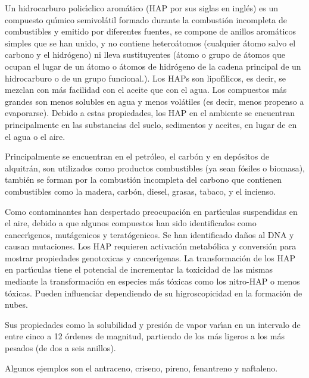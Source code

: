 Un hidrocarburo polic\'{\i}clico arom\'atico   ({HAP} por sus siglas en ingl\'es) es un compuesto qu\'{\i}mico semivol\'atil formado durante la combusti\'on incompleta de combustibles y emitido por diferentes fuentes, se compone de anillos arom\'aticos simples que se han unido, y no contiene hetero\'atomos (cualquier \'atomo salvo el carbono y el hidr\'o\-ge\-no) ni lleva sustituyentes (\'atomo o grupo de \'atomos que ocupan el lugar de un \'atomo o \'atomos de hidr\'ogeno de la cadena principal de un hidrocarburo o de un grupo funcional.). Los HAPs son lipof\'{\i}licos, es decir, se mezclan con m\'as facilidad con el aceite que con el agua. Los compuestos m\'as grandes son menos solubles en agua y menos vol\'atiles (es decir, menos propenso a evaporarse). Debido a estas propiedades, los HAP en el  ambiente se encuentran principalmente en las substancias del suelo, sedimentos y aceites, en lugar de en el agua o el aire. 

Principalmente se encuentran en el petr\'oleo, el carb\'on y en dep\'ositos de alquitr\'an, son utilizados como productos combustibles (ya sean f\'osiles o biomasa), tambi\'en se forman por la combusti\'on incompleta del carbono que contienen combustibles como la madera, carb\'on, diesel, grasas, tabaco, y el incienso.

Como contaminantes han despertado preocupaci\'on en part\'{\i}culas suspendidas en el aire, debido a que algunos compuestos han sido identificados como cancer\'{\i}genos, mut\'agenicos y terat\'ogenicos. Se han identificado da\~nos al DNA y causan mutaciones. Los HAP requieren activaci\'on metab\'olica y conversi\'on para mostrar propiedades \gls{genotoxicas} y cancer\'{\i}genas. La transformaci\'on de los HAP en part\'{\i}culas tiene el potencial de incrementar la toxicidad de las mismas mediante la transformaci\'on en especies m\'as t\'oxicas como los nitro-HAP o menos t\'oxicas.  Pueden influenciar dependiendo de su higroscopicidad en la formaci\'on de nubes.

Sus propiedades como la solubilidad y presi\'on de vapor var\'{\i}an en un intervalo de entre cinco a 12 \'ordenes de magnitud, partiendo de los m\'as ligeros a los m\'as pesados (de dos a seis anillos).

Algunos ejemplos son el antraceno, criseno, pireno, fenantreno y naftaleno.

